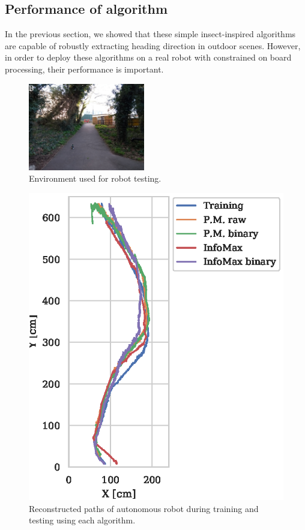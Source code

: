 \documentclass[letterpaper]{article}
\begin{document}
\subsection{Performance of algorithm}
In the previous section, we showed that these simple insect-inspired algorithms are capable of robustly extracting heading direction in outdoor scenes. 
However, in order to deploy these algorithms on a real robot with constrained on board processing, their performance is important. 

\begin{figure}[t]
    \centering
    \includegraphics[width=2in]{figures/robot_environment.jpg}
    \caption{Environment used for robot testing.}
    \label{fig:robot_environment}
\end{figure}

\begin{figure}[t]
    \centering
    \includegraphics{figures/robot_paths.eps}
    \caption{Reconstructed paths of autonomous robot during training and testing using each algorithm.}
    \label{fig:robot_paths}
\end{figure}
\end{document}
